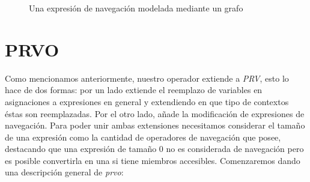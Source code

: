 \begin{figure}
	\begin{center}
		\usetikzlibrary{positioning}
	\end{center}
	\caption{Una expresi\'on de navegaci\'on modelada mediante un grafo}
	\label{figures.examples.navegationExprGraph}
\end{figure}

\section{PRVO}
\label{sec:prvo.prvo}

Como mencionamos anteriormente, nuestro operador extiende a \emph{PRV}, esto lo hace de dos formas: por un lado extiende el reemplazo de variables en asignaciones a expresiones en general y extendiendo en que tipo de contextos \'estas son reemplazadas. Por el otro lado, a\~nade la modificaci\'on de expresiones de navegaci\'on. Para poder unir ambas extensiones necesitamos considerar el tama\~no de una expresi\'on como la cantidad de operadores de navegaci\'on que posee, destacando que una expresi\'on de tama\~no 0 no es considerada de navegaci\'on pero es posible convertirla en una si tiene miembros accesibles. Comenzaremos dando una descripci\'on general de \emph{prvo}:

